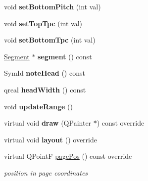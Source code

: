 \begin{DoxyCompactItemize}
\item 
\mbox{\label{class_ms_1_1_ambitus_aeae86196662be536b0b68aff4b2977d2}} 
void {\bfseries set\+Bottom\+Pitch} (int val)
\item 
\mbox{\label{class_ms_1_1_ambitus_a82ce1fa2bdd4ca8fd587ca2d6964cf05}} 
void {\bfseries set\+Top\+Tpc} (int val)
\item 
\mbox{\label{class_ms_1_1_ambitus_ac3565f8147d2e5d78d4f28e7100ba632}} 
void {\bfseries set\+Bottom\+Tpc} (int val)
\item 
\mbox{\label{class_ms_1_1_ambitus_a26f5375f3d56f8f65b07d645b788cf90}} 
\hyperlink{class_ms_1_1_segment}{Segment} $\ast$ {\bfseries segment} () const
\item 
\mbox{\label{class_ms_1_1_ambitus_a87bd1033d756393e9c6f245bd41511ea}} 
Sym\+Id {\bfseries note\+Head} () const
\item 
\mbox{\label{class_ms_1_1_ambitus_ac331ed2970e8fb0f543bf0e941a10e2b}} 
qreal {\bfseries head\+Width} () const
\item 
\mbox{\label{class_ms_1_1_ambitus_ac8d946325f7efddd8364f27b63ec41ae}} 
void {\bfseries update\+Range} ()
\item 
\mbox{\label{class_ms_1_1_ambitus_aa4ef24ff5e51703e8f6cd2025b3e47a3}} 
virtual void {\bfseries draw} (Q\+Painter $\ast$) const override
\item 
\mbox{\label{class_ms_1_1_ambitus_a48ca0c7673fd47eb158ac88ba65d663d}} 
virtual void {\bfseries layout} () override
\item 
\mbox{\label{class_ms_1_1_ambitus_a965b20a15c40b0f387c2f481445cd49a}} 
virtual Q\+PointF \hyperlink{class_ms_1_1_ambitus_a965b20a15c40b0f387c2f481445cd49a}{page\+Pos} () const override
\begin{DoxyCompactList}\small\item\em position in page coordinates \end{DoxyCompactList}\item 

\end{DoxyCompactItemize}
